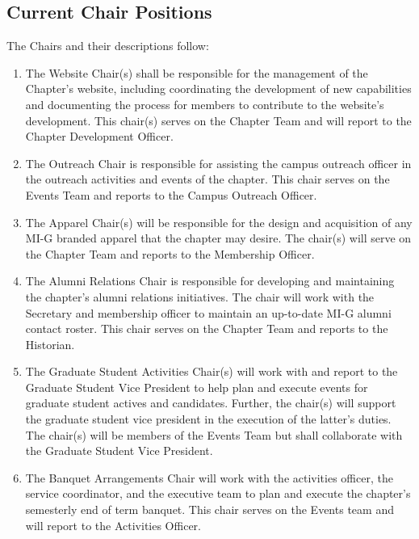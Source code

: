 \subsection{Current Chair Positions} \label{H.1}

The Chairs and their descriptions follow:
\begin{enumerate}

    \item {}
    The Website Chair(s) shall be responsible for the management of the
Chapter’s website, including coordinating the development of new capabilities and
documenting the process for members to contribute to the website’s development.
This chair(s) serves on the Chapter Team and will report to the Chapter Development
Officer.

    \item {}
    The Outreach Chair is responsible for assisting the campus outreach
officer in the outreach activities and events of the chapter. This chair serves on
the Events Team and reports to the Campus Outreach Officer.

    \item {}
    The Apparel Chair(s) will be responsible for the design and acquisition of
any MI-G branded apparel that the chapter may desire. The chair(s) will serve on the
Chapter Team and reports to the Membership Officer.

    \item {}
    The Alumni Relations Chair is responsible for developing
and maintaining the chapter’s alumni relations initiatives. The chair will work
with the Secretary and membership officer to maintain an up-to-date MI-G alumni
contact roster. This chair serves on the Chapter Team and reports to the Historian.

    \item {}
    The Graduate Student Activities Chair(s)
will work with and report to the Graduate Student Vice President to help plan and
execute events for graduate student actives and candidates. Further, the chair(s) will
support the graduate student vice president in the execution of the latter’s duties.
The chair(s) will be members of the Events Team but shall collaborate with the Graduate
Student Vice President.

    \item {}
    The Banquet Arrangements Chair will work with
the activities officer, the service coordinator, and the executive team to plan and execute
the chapter’s semesterly end of term banquet. This chair serves on the Events
team and will report to the Activities Officer.


\end{enumerate}
